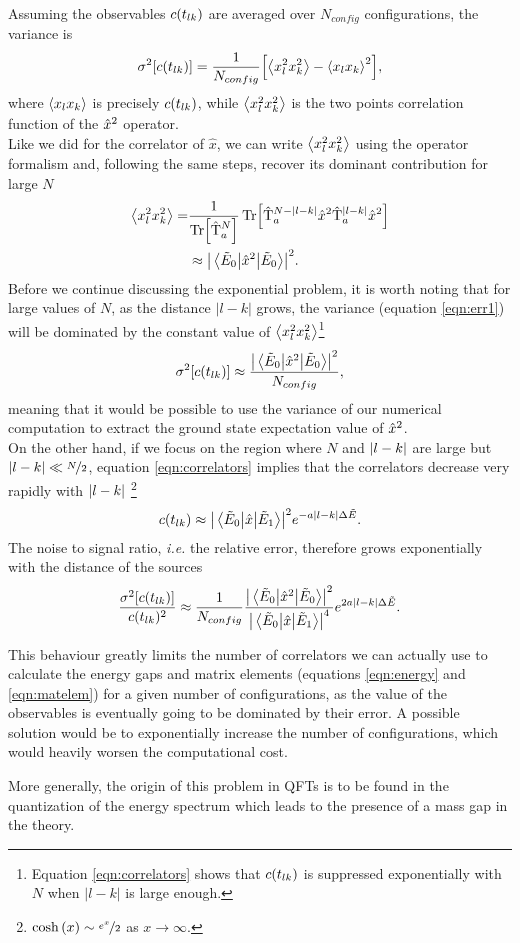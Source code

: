 Assuming the observables $c(t_{lk})$ are averaged over $N_{config}$ configurations, the variance is
\begin{align}
  \label{eqn:err1}
  \sigma ^2\qty[\ct]= \frac{1}{N_{config}}\qty[\ev{x_{l}^2x_{k}^2}-\ev{x_{l}x_{k}}^2],
\end{align}
where $\ev{x_{l}x_{k}}$ is precisely $c(t_{lk})$, while $\ev{x_{l}^2x_{k}^2}$ is the two points correlation function of the
$\hat{x} ^2$ operator. \\Like we did for the correlator of $\hat{x}$, we can write $\ev{x_{l}^{2}x_{k}^{2}}$ using
the operator formalism and, following the same steps, recover its dominant contribution for large $N$
\begin{align}
  \ev{x_{l}^{2}x_{k}^{2}} = &\frac{1}{\Tr[\T{N}]}\Tr[\T{N-\lk}\x^{2}\T{\lk}\x^{2}] \notag\\
  &\approx \abs{\mel{\Et{0}}{\x ^2}{\Et{0}}}^2\label{eqn:xlxkq}.
\end{align}
Before we continue discussing the exponential problem, it is worth noting that for large values of $N$, as the distance $|l-k|$ grows, the variance (equation \ref{eqn:err1})
will be dominated by the constant value of $\ev{x_{l}^{2}x_{k}^{2}}$\footnote{Equation \ref{eqn:correlators} shows that $c(t_{lk})$ is suppressed exponentially with $N$ when $|l-k|$ is large enough.}
\begin{align}
  \label{eqn:varmatrix}
  \sigma^{2}[c(t_{lk})]\approx \frac{ \abs{\mel{\tilde{E}_0}{\hat{x}^2}{\tilde{E}_0}}^2}{N_{config}},
\end{align}
meaning that it would be possible to use the variance of our numerical computation to extract the ground state expectation value of $\hat{x}^{2}$.\\
On the other hand, if we focus on the region where $N$ and $\abs{l-k}$ are large but $\abs{l-k} \ll \nicefrac{N}{2}$, equation \ref{eqn:correlators} implies that the correlators decrease very rapidly with $\abs{l-k}$
\footnote{$\cosh\qty(x)\sim \nicefrac{e^{x}}{2}$ as $x\to\infty$.}
\begin{align}
  \label{eqn:errct}
  c(t_{lk}) \approx \abs{\mel{\tilde{E}_0}{\hat{x}}{\tilde{E}_1}} ^2 e ^{-a\abs{l-k} \Delta \tilde{E}}.
\end{align}
The noise to signal ratio, \textit{i.e.} the relative error, therefore grows exponentially with the distance of the sources
\begin{align}
  \label{eqn:relerr}
 \frac{\sigma ^2\qty[c(t_{lk})]}{c(t_{lk}) ^2}\approx \frac{1}{N_{config}}\frac{\abs{\mel{\tilde{E}_0}{\hat{x}^2}{\tilde{E}_0}}^2}{\abs{\mel{\tilde{E}_0}{\hat{x}}{\tilde{E}_1}}^4}e ^{2a\abs{l-k}\Delta \tilde{E}}.
\end{align}

This behaviour greatly limits the number of correlators we can actually use to calculate the energy gaps and matrix elements (equations \ref{eqn:energy} and \ref{eqn:matelem}) for a given number of configurations, as the value of the observables is eventually going to be dominated by their error.
A possible solution would be to exponentially increase the number of configurations, which would heavily worsen the computational cost.

More generally, the origin of this problem in QFTs is to be found in the quantization of the energy spectrum which leads to the presence of a mass gap in the theory.
